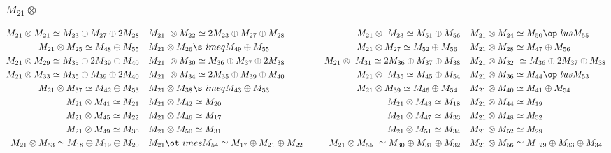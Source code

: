 \subsubsection{$M_21\otimes -$}
\begin{align*}
M_{21} \otimes M_{21} \simeq M_{23} \oplus M_{27} \oplus 2 M_{28} &&& M_{21} \
\otimes M_{22} \simeq 2 M_{23} \oplus M_{27} \oplus M_{28} &&& M_{21} \otimes \
M_{23} \simeq M_{51} \oplus M_{56} &&& M_{21} \otimes M_{24} \simeq M_{50} \op\
lus M_{55}\\
M_{21} \otimes M_{25} \simeq M_{48} \oplus M_{55} &&& M_{21} \otimes M_{26} \s\
imeq M_{49} \oplus M_{55} &&& M_{21} \otimes M_{27} \simeq M_{52} \oplus M_{56\
} &&& M_{21} \otimes M_{28} \simeq M_{47} \oplus M_{56}\\
M_{21} \otimes M_{29} \simeq M_{35} \oplus 2 M_{39} \oplus M_{40} &&& M_{21} \
\otimes M_{30} \simeq M_{36} \oplus M_{37} \oplus 2 M_{38} &&& M_{21} \otimes \
M_{31} \simeq 2 M_{36} \oplus M_{37} \oplus M_{38} &&& M_{21} \otimes M_{32} \
\simeq M_{36} \oplus 2 M_{37} \oplus M_{38}\\
M_{21} \otimes M_{33} \simeq M_{35} \oplus M_{39} \oplus 2 M_{40} &&& M_{21} \
\otimes M_{34} \simeq 2 M_{35} \oplus M_{39} \oplus M_{40} &&& M_{21} \otimes \
M_{35} \simeq M_{45} \oplus M_{54} &&& M_{21} \otimes M_{36} \simeq M_{44} \op\
lus M_{53}\\
M_{21} \otimes M_{37} \simeq M_{42} \oplus M_{53} &&& M_{21} \otimes M_{38} \s\
imeq M_{43} \oplus M_{53} &&& M_{21} \otimes M_{39} \simeq M_{46} \oplus M_{54\
} &&& M_{21} \otimes M_{40} \simeq M_{41} \oplus M_{54}\\
M_{21} \otimes M_{41} \simeq M_{21} &&& M_{21} \otimes M_{42} \simeq M_{20} &&\
& M_{21} \otimes M_{43} \simeq M_{18} &&& M_{21} \otimes M_{44} \simeq M_{19}\
\\
M_{21} \otimes M_{45} \simeq M_{22} &&& M_{21} \otimes M_{46} \simeq M_{17} &&\
& M_{21} \otimes M_{47} \simeq M_{33} &&& M_{21} \otimes M_{48} \simeq M_{32}\
\\
M_{21} \otimes M_{49} \simeq M_{30} &&& M_{21} \otimes M_{50} \simeq M_{31} &&\
& M_{21} \otimes M_{51} \simeq M_{34} &&& M_{21} \otimes M_{52} \simeq M_{29}\
\\
M_{21} \otimes M_{53} \simeq M_{18} \oplus M_{19} \oplus M_{20} &&& M_{21} \ot\
imes M_{54} \simeq M_{17} \oplus M_{21} \oplus M_{22} &&& M_{21} \otimes M_{55\
} \simeq M_{30} \oplus M_{31} \oplus M_{32} &&& M_{21} \otimes M_{56} \simeq M\
_{29} \oplus M_{33} \oplus M_{34}\\
\end{align*}

